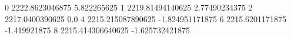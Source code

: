 0 2222.8623046875 5.822265625
1 2219.81494140625 2.77490234375
2 2217.0400390625 0.0
4 2215.215087890625 -1.824951171875
6 2215.6201171875 -1.419921875
8 2215.414306640625 -1.625732421875
